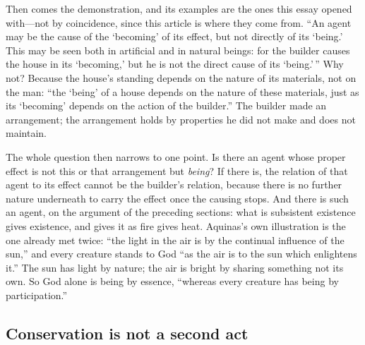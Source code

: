 Then comes the demonstration, and its examples are the ones this essay opened with---not by coincidence, since this article is where they come from. ``An agent may be the cause of the `becoming' of its effect, but not directly of its `being.' This may be seen both in artificial and in natural beings: for the builder causes the house in its `becoming,' but he is not the direct cause of its `being.'\,'' Why not? Because the house's standing depends on the nature of its materials, not on the man: ``the `being' of a house depends on the nature of these materials, just as its `becoming' depends on the action of the builder.'' The builder made an arrangement; the arrangement holds by properties he did not make and does not maintain.

The whole question then narrows to one point. Is there an agent whose proper effect is not this or that arrangement but \emph{being}? If there is, the relation of that agent to its effect cannot be the builder's relation, because there is no further nature underneath to carry the effect once the causing stops. And there is such an agent, on the argument of the preceding sections: what is subsistent existence gives existence, and gives it as fire gives heat. Aquinas's own illustration is the one already met twice: ``the light in the air is by the continual influence of the sun,'' and every creature stands to God ``as the air is to the sun which enlightens it.'' The sun has light by nature; the air is bright by sharing something not its own. So God alone is being by essence, ``whereas every creature has being by participation.''

\subsection{Conservation is not a second act}

